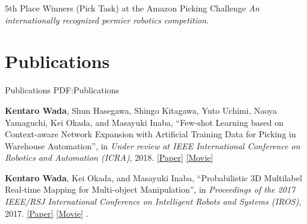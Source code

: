 \documentclass[letterpaper,MMMyyyy,nonstop]{simpleresumecv}
\begin{document}
\begin{body}
\BigGapNoBreak

5th Place Winners (Pick Task) at the Amazon Picking Challenge
\hfill
{\it {}}
\newline
{\it An internationally recognized permier robotics competition.}


\section
{Publications}
{Publications}
{PDF:Publications}



\textbf{Kentaro Wada}, Shun Hasegawa, Shingo Kitagawa, Yuto Uchimi, Naoya Yamaguchi, Kei Okada, and Masayuki Inaba,
``Few-shot Learning based on Context-aware Network Expansion with Artificial Training Data for Picking in Warehouse Automation'',
in \textit{Under review at IEEE International Conference on Robotics and Automation (ICRA)}, 2018.
\href{https://drive.google.com/open?id=1wLL3vXzOuxBeimeHqjvpc74gMmeipoCJ}{\underline{[Paper]}}
\href{https://drive.google.com/open?id=1-hWOkueOqEYKIV0WDsxO3JOroIE56F8u}{\underline{[Movie]}}

\BigGapNoBreak

\textbf{Kentaro Wada}, Kei Okada, and Masayuki Inaba,
``Probabilistic 3D Multilabel Real-time Mapping for Multi-object Manipulation'',
in \textit{Proceedings of the 2017 IEEE/RSJ International Conference on Intelligent Robots and Systems (IROS)}, 2017.
\href{https://drive.google.com/open?id=1frqieyHiQBqpr1e9mWPrzfaX8FbpLcuX}{\underline{[Paper]}}
\href{https://drive.google.com/open?id=1nUFB1_jHLomxAEhlWsgaMRkdGycB5Dhk}{\underline{[Movie]}}
.


\end{body}
\end{document}
